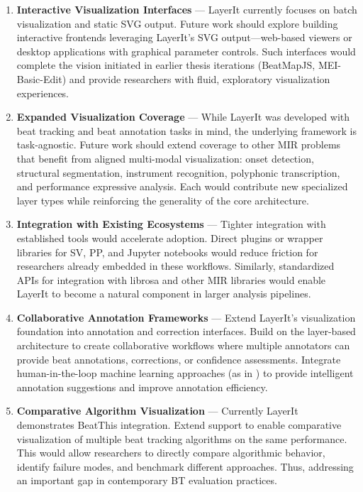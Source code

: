 \begin{enumerate}
\item \textbf{Interactive Visualization Interfaces} — LayerIt currently focuses on batch visualization and static SVG output. Future work should explore building interactive frontends leveraging LayerIt's SVG output—web-based viewers or desktop applications with graphical parameter controls. Such interfaces would complete the vision initiated in earlier thesis iterations (BeatMapJS, MEI-Basic-Edit) and provide researchers with fluid, exploratory visualization experiences.
\item \textbf{Expanded Visualization Coverage} — While LayerIt was developed with beat tracking and beat annotation tasks in mind, the underlying framework is task-agnostic. Future work should extend coverage to other MIR problems that benefit from aligned multi-modal visualization: onset detection, structural segmentation, instrument recognition, polyphonic transcription, and performance expressive analysis. Each would contribute new specialized layer types while reinforcing the generality of the core architecture.

\item \textbf{Integration with Existing Ecosystems} — Tighter integration with established tools would accelerate adoption. Direct plugins or wrapper libraries for SV, PP, and Jupyter notebooks would reduce friction for researchers already embedded in these workflows. Similarly, standardized APIs for integration with librosa and other MIR libraries would enable LayerIt to become a natural component in larger analysis pipelines.

\item \textbf{Collaborative Annotation Frameworks} — Extend LayerIt's visualization foundation into annotation and correction interfaces. Build on the layer-based architecture to create collaborative workflows where multiple annotators can provide beat annotations, corrections, or confidence assessments. Integrate human-in-the-loop machine learning approaches (as in \cite{yamamotoHumanintheLoopAdaptationInteractive2021}) to provide intelligent annotation suggestions and improve annotation efficiency.

\item \textbf{Comparative Algorithm Visualization} — Currently LayerIt demonstrates BeatThis integration. Extend support to enable comparative visualization of multiple beat tracking algorithms on the same performance. This would allow researchers to directly compare algorithmic behavior, identify failure modes, and benchmark different approaches. Thus, addressing an important gap in contemporary BT evaluation practices.


\end{enumerate}
